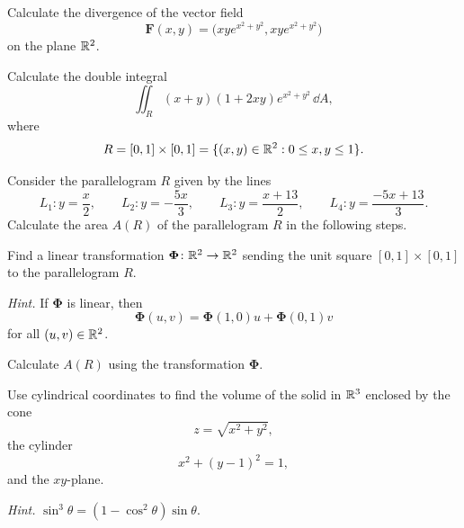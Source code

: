 \begin{problem}
\begin{problemsubparts}
\item Calculate the divergence of the vector field
\[
\mathbf F(x,y)=
\bigl(xy e^{x^2+y^2},xy e^{x^2+y^2}\bigr)
\]
on the plane $\mathbb{R}^2$.
\item Calculate the double integral
\[
\iint_R (x+y)(1+2xy)e^{x^2+y^2}\,\dd A,
\]
where
\[
R=[0,1]\times[0,1]
=\{(x,y)\in\mathbb{R}^2:0\le x,y\le1\}.
\]
\end{problemsubparts}
\end{problem}

\begin{problem}
Consider the parallelogram $R$ given by the lines
\[
L_1\colon y=\frac{x}{2},
\qquad
L_2\colon y=-\frac{5x}{3},
\qquad
L_3\colon y=\frac{x+13}{2},
\qquad
L_4\colon y=\frac{-5x+13}{3}.
\]
Calculate the area $A(R)$ of the parallelogram $R$ in the following steps.
\begin{problemsubparts}
\item Find a linear transformation $\boldsymbol{\Phi}\colon\mathbb{R}^2\to\mathbb{R}^2$ sending the unit square $[0,1]\times[0,1]$ to the parallelogram $R$.

\textit{Hint.} If $\boldsymbol{\Phi}$ is linear, then
\[
\boldsymbol{\Phi}(u,v)
=\boldsymbol{\Phi}(1,0)u+\boldsymbol{\Phi}(0,1)v
\]
for all $(u,v)\in\mathbb{R}^2$.
\item Calculate $A(R)$ using the transformation $\boldsymbol{\Phi}$.
\end{problemsubparts}
\end{problem}

\begin{problem}
Use cylindrical coordinates to find the volume of the solid in $\mathbb{R}^3$ enclosed by the cone
\[
z=\sqrt{x^2+y^2},
\]
the cylinder
\[
x^2+(y-1)^2=1,
\]
and the $xy$-plane.

\textit{Hint.} $\sin^3\theta=(1-\cos^2\theta)\sin\theta$.
\end{problem}

